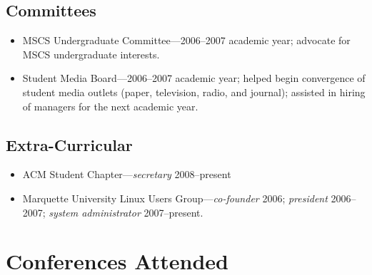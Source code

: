 \documentclass[12pt]{article}
\begin{document}
\subsection*{Committees}
\begin{itemize}
	\item MSCS Undergraduate Committee---2006--2007 academic year; advocate
	for MSCS undergraduate interests.
	\item Student Media Board---2006--2007 academic year; helped begin
	convergence of student media outlets (paper, television, radio, and
	journal); assisted in hiring of managers for the next academic year.
\end{itemize}

\subsection*{Extra-Curricular}
\begin{itemize}
	\item ACM Student Chapter---{\em secretary} 2008--present
	\item Marquette University Linux Users Group---{\em co-founder} 2006;
	{\em president} 2006--2007; {\em system administrator} 2007--present.
\end{itemize}

\section*{Conferences Attended}
\end{document}
